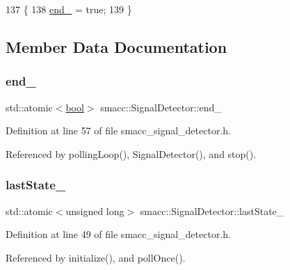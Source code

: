 \begin{DoxyCode}
137 \{
138     \hyperlink{classsmacc_1_1SignalDetector_aaee266393c01693528a2d74b1f2354a2}{end\_} = \textcolor{keyword}{true};
139 \}
\end{DoxyCode}


\subsection{Member Data Documentation}
\mbox{\label{classsmacc_1_1SignalDetector_aaee266393c01693528a2d74b1f2354a2}} 
\subsubsection{\texorpdfstring{end\+\_\+}{end\_}}
{\footnotesize\ttfamily std\+::atomic$<$\hyperlink{classbool}{bool}$>$ smacc\+::\+Signal\+Detector\+::end\+\_\+\hspace{0.3cm}{\ttfamily [private]}}



Definition at line 57 of file smacc\+\_\+signal\+\_\+detector.\+h.



Referenced by polling\+Loop(), Signal\+Detector(), and stop().

\mbox{\label{classsmacc_1_1SignalDetector_a72293ed0e98f4200fbe75b53f1e41eab}} 
\subsubsection{\texorpdfstring{last\+State\+\_\+}{lastState\_}}
{\footnotesize\ttfamily std\+::atomic$<$unsigned long$>$ smacc\+::\+Signal\+Detector\+::last\+State\+\_\+\hspace{0.3cm}{\ttfamily [private]}}



Definition at line 49 of file smacc\+\_\+signal\+\_\+detector.\+h.



Referenced by initialize(), and poll\+Once().

